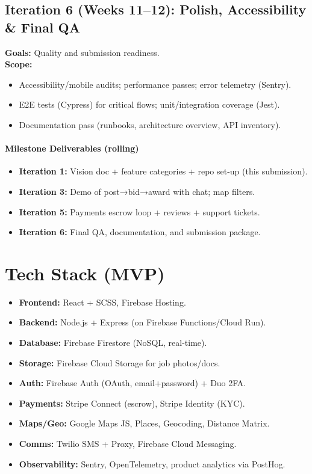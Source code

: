 \documentclass[11pt]{article}
\begin{document}
\subsection*{Iteration 6 (Weeks 11--12): Polish, Accessibility \& Final QA}
\textbf{Goals:} Quality and submission readiness. \\
\textbf{Scope:}
\begin{itemize}[leftmargin=1.4em]
  \item Accessibility/mobile audits; performance passes; error telemetry (Sentry).
  \item E2E tests (Cypress) for critical flows; unit/integration coverage (Jest).
  \item Documentation pass (runbooks, architecture overview, API inventory).
\end{itemize}

\paragraph{Milestone Deliverables (rolling)}
\begin{itemize}[leftmargin=1.4em]
  \item \textbf{Iteration 1:} Vision doc + feature categories + repo set-up (this submission).
  \item \textbf{Iteration 3:} Demo of post→bid→award with chat; map filters.
  \item \textbf{Iteration 5:} Payments escrow loop + reviews + support tickets.
  \item \textbf{Iteration 6:} Final QA, documentation, and submission package.
\end{itemize}
\section{Tech Stack (MVP)}
\begin{itemize}[leftmargin=1.4em]
  \item \textbf{Frontend:} React + SCSS, Firebase Hosting.
  \item \textbf{Backend:} Node.js + Express (on Firebase Functions/Cloud Run).
  \item \textbf{Database:} Firebase Firestore (NoSQL, real-time).
  \item \textbf{Storage:} Firebase Cloud Storage for job photos/docs.
  \item \textbf{Auth:} Firebase Auth (OAuth, email+password) + Duo 2FA.
  \item \textbf{Payments:} Stripe Connect (escrow), Stripe Identity (KYC).
  \item \textbf{Maps/Geo:} Google Maps JS, Places, Geocoding, Distance Matrix.
  \item \textbf{Comms:} Twilio SMS + Proxy, Firebase Cloud Messaging.
  \item \textbf{Observability:} Sentry, OpenTelemetry, product analytics via PostHog.
\end{itemize}
\end{document}
